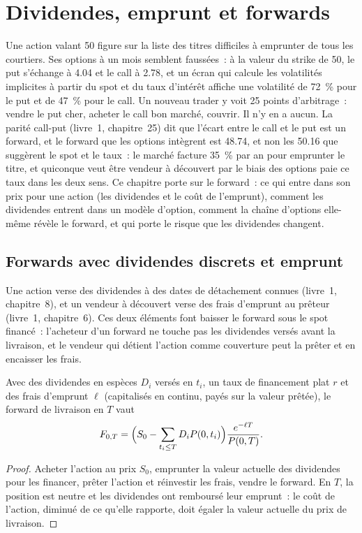 \chapter{Dividendes, emprunt et forwards}\label{ch:dv:dividends-borrow-and-forwards}

Une action valant 50 figure sur la liste des titres difficiles à emprunter de tous les courtiers. Ses options à un mois semblent faussées~:
à la valeur du strike de 50, le put s'échange à 4.04 et le call à 2.78,
et un écran qui calcule les volatilités implicites à partir du spot et du taux d'intérêt
affiche une volatilité de 72~\% pour le put et de 47~\% pour le call. Un nouveau trader y voit 25
points d'arbitrage~: vendre le put cher, acheter le call bon marché, couvrir. Il n'y en a
aucun. La parité call-put (livre~1, chapitre~25) dit que l'écart entre le call et le put est un forward,
et le forward que les options intègrent est
48.74, et non les 50.16 que suggèrent le spot et le taux~: le marché facture
35~\% par an pour emprunter le titre, et quiconque veut être vendeur à découvert
par le biais des options paie ce taux dans les deux sens. Ce chapitre porte sur le forward~: ce qui
entre dans son prix pour une action (les dividendes et le coût de l'emprunt), comment les dividendes
entrent dans un modèle d'option, comment la chaîne d'options elle-même révèle le forward, et qui porte
le risque que les dividendes changent.

\section{Forwards avec dividendes discrets et emprunt}

Une action verse des dividendes à des dates de détachement connues (livre~1, chapitre~8),
et un vendeur à découvert verse des frais d'emprunt au prêteur (livre~1, chapitre~6).
Ces deux éléments font baisser le forward sous le spot financé~: l'acheteur d'un
forward ne touche pas les dividendes versés avant la livraison, et le vendeur qui détient l'action
comme couverture peut la prêter et en encaisser les frais.

\begin{proposition}\label{prop:dv:dividends-borrow-and-forwards:fwd}
Avec des dividendes en espèces $D_i$ versés en $t_i$, un taux de financement plat $r$ et des frais d'emprunt
$\ell$ (capitalisés en continu, payés sur la valeur prêtée), le forward de livraison
en $T$ vaut
\[
F_{0,T}=\Bigl(S_0-\sum_{t_i\le T}D_iP(0,t_i)\Bigr)\frac{e^{-\ell T}}{P(0,T)} .
\]
\end{proposition}
\begin{proof}
Acheter l'action au prix $S_0$, emprunter la valeur actuelle des dividendes pour les financer,
prêter l'action et réinvestir les frais, vendre le forward. En $T$, la position est
neutre et les dividendes ont remboursé leur emprunt~: le coût de l'action, diminué de ce
qu'elle rapporte, doit égaler la valeur actuelle du prix de livraison.
\end{proof}

